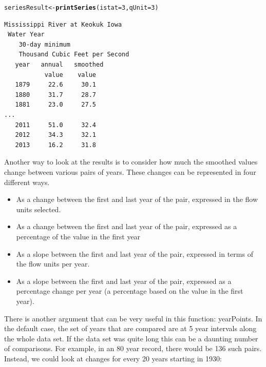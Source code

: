 \documentclass[a4paper,11pt]{article}\usepackage{graphicx, color}
\makeatletter
\newcommand{\hlfunctioncall}[1]{\textcolor[rgb]{0.501960784313725,0,0.329411764705882}{\textbf{#1}}}%
\newenvironment{kframe}{%
 \def\at@end@of@kframe{}%
 \ifinner\ifhmode%
  \def\at@end@of@kframe{\end{minipage}}%
  \begin{minipage}{\columnwidth}%
 \fi\fi%
 \def\FrameCommand##1{\hskip\@totalleftmargin \hskip-\fboxsep
 \colorbox{shadecolor}{##1}\hskip-\fboxsep
     \hskip-\linewidth \hskip-\@totalleftmargin \hskip\columnwidth}%
 \MakeFramed {\advance\hsize-\width
   \@totalleftmargin\z@ \linewidth\hsize
   \@setminipage}}%
 {\par\unskip\endMakeFramed%
 \at@end@of@kframe}
\newenvironment{knitrout}{}{} %
\makeatother
\begin{document}
\begin{knitrout}
\color{fgcolor}\begin{kframe}
\begin{alltt}
seriesResult <- \hlfunctioncall{printSeries}(istat=3, qUnit=3)
\end{alltt}
\end{kframe}
\end{knitrout}


\begin{verbatim}
Mississippi River at Keokuk Iowa
 Water Year
    30-day minimum
    Thousand Cubic Feet per Second
   year   annual   smoothed
           value    value
   1879     22.6     30.1
   1880     31.7     28.7
   1881     23.0     27.5
...
   2011     51.0     32.4
   2012     34.3     32.1
   2013     16.2     31.8
\end{verbatim}

Another way to look at the results is to consider how much the smoothed values change between various pairs of years.  These changes can be represented in four different ways.  
\begin{itemize}
  \item As a change between the first and last year of the pair, expressed in the flow units selected.
  \item As a change between the first and last year of the pair, expressed as a percentage of the value in the first year
  \item As a slope between the first and last year of the pair, expressed in terms of the flow units per year.
  \item As a slope between the first and last year of the pair, expressed as a percentage change per year (a percentage based on the value in the first year).
\end{itemize}

There is another argument that can be very useful in this function: yearPoints.  In the default case, the set of years that are compared are at 5 year intervals along the whole data set.  If the data set was quite long this can be a daunting number of comparisons.  For example, in an 80 year record, there would be 136 such pairs. Instead, we could look at changes for every 20 years starting in 1930: 
\end{document}
